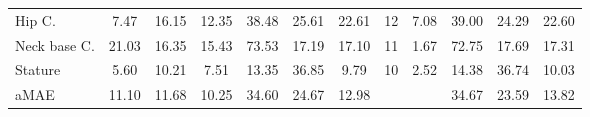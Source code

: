 \begin{table}[t!]
\begin{center}
\begin{tabular}{|l|c|c|c|c|c|c|c|c|c|c|c|}
Hip C.               & 7.47    & 16.15    & 12.35 & 38.48   & 25.61 & 22.61               & 12   & 7.08   & 39.00 & 24.29 & 22.60 \\
Neck base C.         & 21.03   & 16.35    & 15.43 & 73.53   & 17.19 & 17.10               & 11  & 1.67    & 72.75 & 17.69 & 17.31 \\
Stature              & 5.60    & 10.21    & 7.51 & 13.35   & 36.85 & 9.79                 & 10 & 2.52   & 14.38 & 36.74 & 10.03 \\  \hline \hline
aMAE                 &  11.10   &  11.68    & 10.25 & 34.60   & 24.67 & 12.98    &      \multicolumn{2}{c|}{}   & 34.67 & 23.59 & 13.82 \\   \cline{1-7}  \cline{10-12}
\end{tabular}
\end{center}
\end{table}